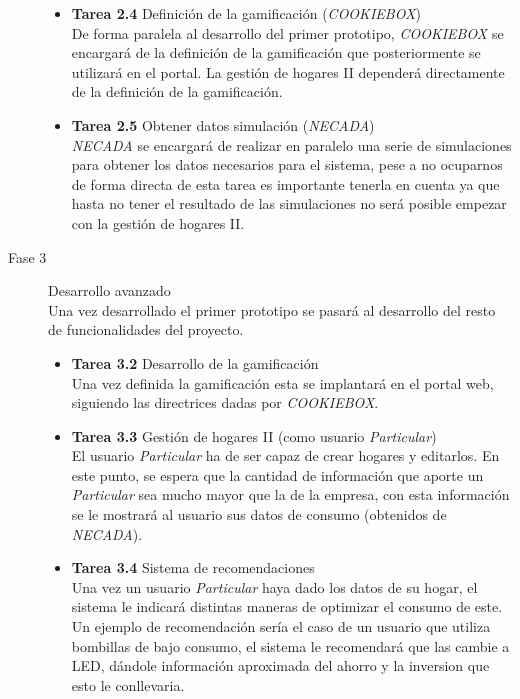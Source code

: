 \begin{description}
\begin{itemize}
        \item \textbf{Tarea 2.4} Definición de la gamificación (\textit{COOKIEBOX})\\
        De forma paralela al desarrollo del primer prototipo, \textit{COOKIEBOX} se encargará de la definición de la gamificación que posteriormente se utilizará en el portal. La gestión de hogares II dependerá directamente de la definición de la gamificación.
        \item \textbf{Tarea 2.5} Obtener datos simulación (\textit{NECADA})\\
        \textit{NECADA} se encargará de realizar en paralelo una serie de simulaciones para obtener los datos necesarios para el sistema, pese a no ocuparnos de forma directa de esta tarea es importante tenerla en cuenta ya que hasta no tener el resultado de las simulaciones no será posible empezar con la gestión de hogares II. 
    \end{itemize}
  \item[Fase 3] Desarrollo avanzado\\
  Una vez desarrollado el primer prototipo se pasará al desarrollo del resto de funcionalidades del proyecto.
  \begin{itemize}
        \item \textbf{Tarea 3.2} Desarrollo de la gamificación\\
        Una vez definida la gamificación esta se implantará en el portal web, siguiendo las directrices dadas por \textit{COOKIEBOX}. 
        \item \textbf{Tarea 3.3} Gestión de hogares II (como usuario \textit{Particular})\\
        El usuario \textit{Particular} ha de ser capaz de crear hogares y editarlos. En este punto, se espera que la cantidad de información que aporte un \textit{Particular} sea mucho mayor que la de la empresa, con esta información se le mostrará al usuario sus datos de consumo (obtenidos de \textit{NECADA}).
        \item \textbf{Tarea 3.4} Sistema de recomendaciones\\
        Una vez un usuario \textit{Particular} haya dado los datos de su hogar, el sistema le indicará distintas maneras de optimizar el consumo de este. Un ejemplo de recomendación sería el caso de un usuario que utiliza bombillas de bajo consumo, el sistema le recomendará que las cambie a LED, dándole información aproximada del ahorro y la inversion que esto le conllevaria.
    \end{itemize}

\end{description}
